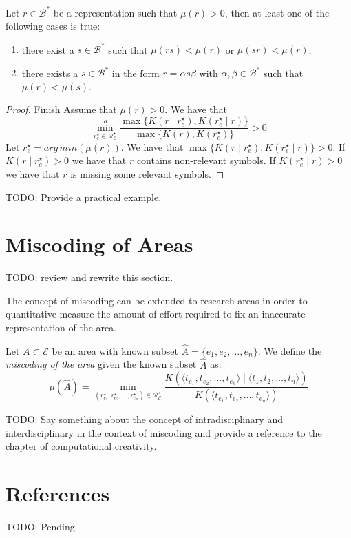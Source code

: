 \begin{theorem}
\label{th:reduce_miscoding}
Let $r \in \mathcal{B}^\ast$ be a representation such that $\mu(r) >0$, then at least one of the following cases is true:
\begin{enumerate}[label=(\roman*)]
\item there exist a $s \in \mathcal{B}^\ast$ such that $\mu(rs) < \mu(r)$ or $\mu(sr) < \mu(r)$,
\item there exists a $s \in \mathcal{B}^\ast$ in the form $r = \alpha s \beta$ with $\alpha, \beta \in \mathcal{B}^\ast$ such that $\mu(r) < \mu(s)$.
\end{enumerate}
\end{theorem}
\begin{proof}
{\color{red} Finish}
Assume that $\mu(r) >0$. We have that
\[
\overset{o}{ \underset{ r^\star_e \in \mathcal{R}^\star_\mathcal{E} } \min} \frac{ \max\{ K \left( r \mid r^\star_e \right), K \left( r^\star_e \mid r \right) \} } { \max\{ K \left( r \right), K \left( r^\star_e \right) \} } > 0
\]
Let $r^\star_e = arg\,min \left( \mu(r) \right)$. We have that $\max\{ K \left( r \mid r^\star_e \right), K \left( r^\star_e \mid r \right) \} > 0$. If $K \left( r \mid r^\star_e \right) > 0$ we have that $r$ contains non-relevant symbols. If $K \left( r^\star_e \mid r \right) > 0$ we have that $r$ is missing some relevant symbols.
\end{proof}

\begin{example}
{\color{red} TODO: Provide a practical example.}
\end{example}

%
%
\section{Miscoding of Areas}
\label{sec:miscoding_areas}

{\color{red} TODO: review and rewrite this section.}

The concept of miscoding can be extended to research areas in order to quantitative measure the amount of effort required to fix an inaccurate representation of the area.

\begin{definition}
Let $A \subset \mathcal{E}$ be an area with known subset $\hat{A} = \{e_1, e_2, \ldots, e_n\}$. We define the \emph{miscoding of the area} given the known subset $\hat{A}$ as:
\[
\mu(\hat{A}) = \min_{(r^\star_{e_1}, r^\star_{e_2}, \ldots, r^\star_{e_n}) \in \mathcal{R}^\star_\mathcal{E}}  \frac{K \left( \langle t_{e_1}, t_{e_2}, \ldots, t_{e_n} \rangle \mid \langle t_1, t_2, \ldots, t_n \rangle \right) }{K \left( \langle t_{e_1}, t_{e_2}, \ldots, t_{e_n} \rangle \right)}
\]
\end{definition}

{\color{red} TODO: Say something about the concept of intradisciplinary and interdisciplinary in the context of miscoding and provide a reference to the chapter of computational creativity.}

%
%

\section*{References}

{\color{red} TODO: Pending.}
